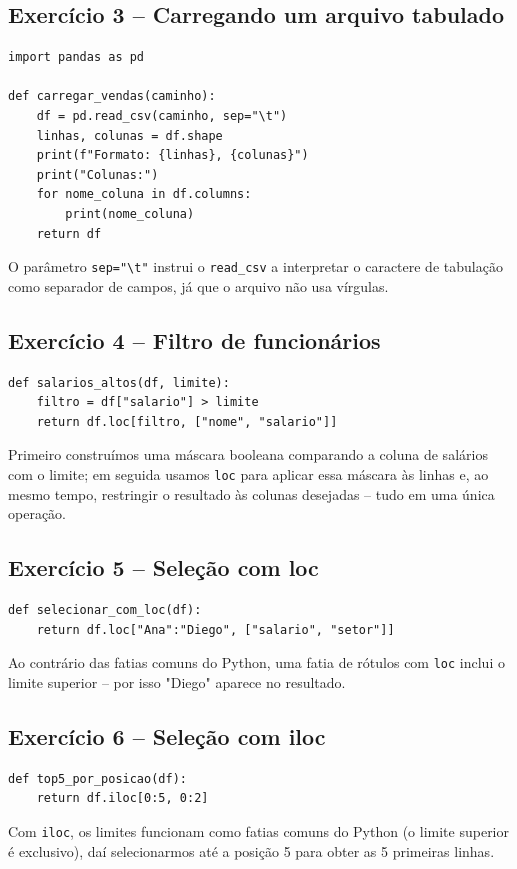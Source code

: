 \documentclass[11pt,a4paper]{article}
\begin{document}
\subsection*{Exercício 3 -- Carregando um arquivo tabulado}
\begin{solucao}
\begin{lstlisting}
import pandas as pd

def carregar_vendas(caminho):
    df = pd.read_csv(caminho, sep="\t")
    linhas, colunas = df.shape
    print(f"Formato: {linhas}, {colunas}")
    print("Colunas:")
    for nome_coluna in df.columns:
        print(nome_coluna)
    return df
\end{lstlisting}
O parâmetro \texttt{sep="\textbackslash t"} instrui o \texttt{read\_csv} a interpretar o caractere de tabulação como separador de campos, já que o arquivo não usa vírgulas.
\end{solucao}

\subsection*{Exercício 4 -- Filtro de funcionários}
\begin{solucao}
\begin{lstlisting}
def salarios_altos(df, limite):
    filtro = df["salario"] > limite
    return df.loc[filtro, ["nome", "salario"]]
\end{lstlisting}
Primeiro construímos uma máscara booleana comparando a coluna de salários com o limite; em seguida usamos \texttt{loc} para aplicar essa máscara às linhas e, ao mesmo tempo, restringir o resultado às colunas desejadas -- tudo em uma única operação.
\end{solucao}

\subsection*{Exercício 5 -- Seleção com loc}
\begin{solucao}
\begin{lstlisting}
def selecionar_com_loc(df):
    return df.loc["Ana":"Diego", ["salario", "setor"]]
\end{lstlisting}
Ao contrário das fatias comuns do Python, uma fatia de rótulos com \texttt{loc} inclui o limite superior -- por isso "Diego" aparece no resultado.
\end{solucao}

\subsection*{Exercício 6 -- Seleção com iloc}
\begin{solucao}
\begin{lstlisting}
def top5_por_posicao(df):
    return df.iloc[0:5, 0:2]
\end{lstlisting}
Com \texttt{iloc}, os limites funcionam como fatias comuns do Python (o limite superior é exclusivo), daí selecionarmos até a posição 5 para obter as 5 primeiras linhas.
\end{solucao}
\end{document}

